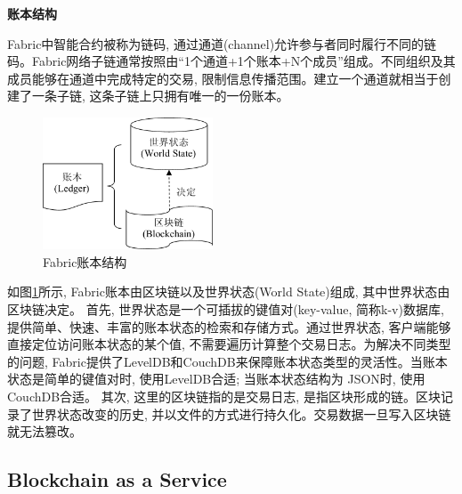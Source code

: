 \textbf{账本结构}

Fabric中智能合约被称为链码, 通过通道(channel)允许参与者同时履行不同的链码。Fabric网络子链通常按照由“1个通道+1个账本+N个成员”组成。不同组织及其成员能够在通道中完成特定的交易, 限制信息传播范围。建立一个通道就相当于创建了一条子链, 这条子链上只拥有唯一的一份账本。

\begin{figure}[h] %
    \centering %
    \includegraphics[width=0.45\textwidth]{FIGs/chapter2/ledger.pdf} %
    \caption{Fabric账本结构} %
    \label{fabric_ledger} %
\end{figure}%

如图\ref{fabric_ledger}所示, Fabric账本由区块链以及世界状态(World State)组成, 其中世界状态由区块链决定。
首先, 世界状态是一个可插拔的键值对(key-value, 简称k-v)数据库, 提供简单、快速、丰富的账本状态的检索和存储方式。通过世界状态, 客户端能够直接定位访问账本状态的某个值, 不需要遍历计算整个交易日志。为解决不同类型的问题, Fabric提供了LevelDB和CouchDB来保障账本状态类型的灵活性。当账本状态是简单的键值对时, 使用LevelDB合适; 当账本状态结构为 JSON时, 使用CouchDB合适。
其次, 这里的区块链指的是交易日志, 是指区块形成的链。区块记录了世界状态改变的历史, 并以文件的方式进行持久化。交易数据一旦写入区块链就无法篡改。

\subsection{Blockchain as a Service}\label{section: BaaS}

